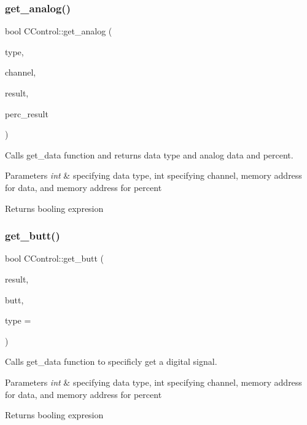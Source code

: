 \subsubsection{\texorpdfstring{get\+\_\+analog()}{get\_analog()}}
{\footnotesize\ttfamily bool C\+Control\+::get\+\_\+analog (\begin{DoxyParamCaption}\item[{int}]{type,  }\item[{int}]{channel,  }\item[{int \&}]{result,  }\item[{int \&}]{perc\+\_\+result }\end{DoxyParamCaption})}



Calls get\+\_\+data function and returns data type and analog data and percent. 


\begin{DoxyParams}{Parameters}
{\em int} & specifying data type, int specifying channel, memory address for data, and memory address for percent \\
\hline
\end{DoxyParams}
\begin{DoxyReturn}{Returns}
booling expresion 
\end{DoxyReturn}
\hypertarget{class_c_control_ad4a408390baa24847dc16cb49b64ddad}{}\label{class_c_control_ad4a408390baa24847dc16cb49b64ddad} 
\subsubsection{\texorpdfstring{get\+\_\+butt()}{get\_butt()}}
{\footnotesize\ttfamily bool C\+Control\+::get\+\_\+butt (\begin{DoxyParamCaption}\item[{int \&}]{result,  }\item[{int}]{butt,  }\item[{int}]{type = {} }\end{DoxyParamCaption})}



Calls get\+\_\+data function to specificly get a digital signal. 


\begin{DoxyParams}{Parameters}
{\em int} & specifying data type, int specifying channel, memory address for data, and memory address for percent \\
\hline
\end{DoxyParams}
\begin{DoxyReturn}{Returns}
booling expresion 
\end{DoxyReturn}
\hypertarget{class_c_control_a0bad8e51e54cb6f1e2a7b51d3a3940d3}{}\label{class_c_control_a0bad8e51e54cb6f1e2a7b51d3a3940d3} 

